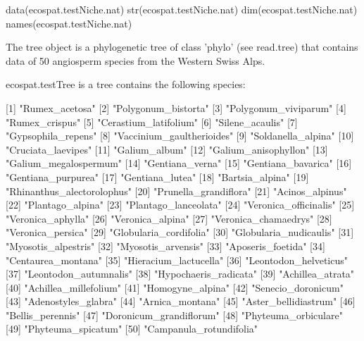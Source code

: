 \documentclass[a4paper]{book}
\begin{document}
%
\begin{SeeAlso}\relax
{}
\end{SeeAlso}
%
\begin{Examples}
\begin{ExampleCode}
data(ecospat.testNiche.nat)
str(ecospat.testNiche.nat)
dim(ecospat.testNiche.nat)
names(ecospat.testNiche.nat)
\end{ExampleCode}
\end{Examples}
%
\begin{Description}\relax
The tree object is a phylogenetic tree of class 'phylo' (see read.tree) that contains data of 50 angiosperm species from the Western Swiss Alps.
\end{Description}
%
\begin{Format}
ecospat.testTree is a tree contains the following species:

[1] "Rumex\_acetosa"            
[2] "Polygonum\_bistorta"       
[3] "Polygonum\_viviparum"      
[4] "Rumex\_crispus"            
[5] "Cerastium\_latifolium"     
[6] "Silene\_acaulis"           
[7] "Gypsophila\_repens"        
[8] "Vaccinium\_gaultherioides" 
[9] "Soldanella\_alpina"        
[10] "Cruciata\_laevipes"        
[11] "Galium\_album"             
[12] "Galium\_anisophyllon"      
[13] "Galium\_megalospermum"     
[14] "Gentiana\_verna"           
[15] "Gentiana\_bavarica"        
[16] "Gentiana\_purpurea"        
[17] "Gentiana\_lutea"           
[18] "Bartsia\_alpina"           
[19] "Rhinanthus\_alectorolophus"
[20] "Prunella\_grandiflora"     
[21] "Acinos\_alpinus"           
[22] "Plantago\_alpina"          
[23] "Plantago\_lanceolata"      
[24] "Veronica\_officinalis"     
[25] "Veronica\_aphylla"         
[26] "Veronica\_alpina"          
[27] "Veronica\_chamaedrys"      
[28] "Veronica\_persica"         
[29] "Globularia\_cordifolia"    
[30] "Globularia\_nudicaulis"    
[31] "Myosotis\_alpestris"       
[32] "Myosotis\_arvensis"        
[33] "Aposeris\_foetida"         
[34] "Centaurea\_montana"        
[35] "Hieracium\_lactucella"     
[36] "Leontodon\_helveticus"     
[37] "Leontodon\_autumnalis"     
[38] "Hypochaeris\_radicata"     
[39] "Achillea\_atrata"          
[40] "Achillea\_millefolium"     
[41] "Homogyne\_alpina"          
[42] "Senecio\_doronicum"        
[43] "Adenostyles\_glabra"       
[44] "Arnica\_montana"           
[45] "Aster\_bellidiastrum"      
[46] "Bellis\_perennis"          
[47] "Doronicum\_grandiflorum"   
[48] "Phyteuma\_orbiculare"      
[49] "Phyteuma\_spicatum"        
[50] "Campanula\_rotundifolia" 

\end{Format}
\end{document}
